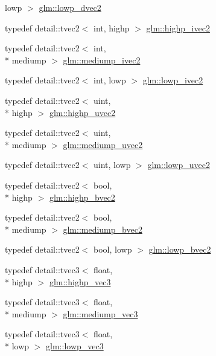 \begin{DoxyCompactItemize}
lowp $>$ \hyperlink{group__core__precision_ga27a115a27d5f065e8c043f57191d583b}{glm\-::lowp\-\_\-dvec2}
\item 
typedef detail\-::tvec2$<$ int, highp $>$ \hyperlink{group__core__precision_gab2bac6095f51f7d7f74747afc2f6747a}{glm\-::highp\-\_\-ivec2}
\item 
typedef detail\-::tvec2$<$ int, \\*
mediump $>$ \hyperlink{group__core__precision_ga4f1bf9844e667805235823afe809aa73}{glm\-::mediump\-\_\-ivec2}
\item 
typedef detail\-::tvec2$<$ int, lowp $>$ \hyperlink{group__core__precision_ga562c5c67d6431ab88fc4a032239e2137}{glm\-::lowp\-\_\-ivec2}
\item 
typedef detail\-::tvec2$<$ uint, \\*
highp $>$ \hyperlink{group__core__precision_gaaf92be4c1fca33cff90c1ed15b521c79}{glm\-::highp\-\_\-uvec2}
\item 
typedef detail\-::tvec2$<$ uint, \\*
mediump $>$ \hyperlink{group__core__precision_ga15c8fb77bdb6763ef73b39e02eb98a56}{glm\-::mediump\-\_\-uvec2}
\item 
typedef detail\-::tvec2$<$ uint, lowp $>$ \hyperlink{group__core__precision_ga06c64bb528bbecf276ab2d4a2b6c934e}{glm\-::lowp\-\_\-uvec2}
\item 
typedef detail\-::tvec2$<$ bool, \\*
highp $>$ \hyperlink{group__core__precision_ga4153415d1f3d390219ac9464652ac377}{glm\-::highp\-\_\-bvec2}
\item 
typedef detail\-::tvec2$<$ bool, \\*
mediump $>$ \hyperlink{group__core__precision_ga1406d96eb96694d91052d3f882658ab2}{glm\-::mediump\-\_\-bvec2}
\item 
typedef detail\-::tvec2$<$ bool, lowp $>$ \hyperlink{group__core__precision_ga8ff6222d4bb4245106dab0727c8e8a45}{glm\-::lowp\-\_\-bvec2}
\item 
typedef detail\-::tvec3$<$ float, \\*
highp $>$ \hyperlink{group__core__precision_ga4879124da7a18d6b681d933cb8c4267d}{glm\-::highp\-\_\-vec3}
\item 
typedef detail\-::tvec3$<$ float, \\*
mediump $>$ \hyperlink{group__core__precision_ga10acc767a046b85205f52ce7f834626f}{glm\-::mediump\-\_\-vec3}
\item 
typedef detail\-::tvec3$<$ float, \\*
lowp $>$ \hyperlink{group__core__precision_ga062795097526e2758d34cb38387dd82d}{glm\-::lowp\-\_\-vec3}

\end{DoxyCompactItemize}
